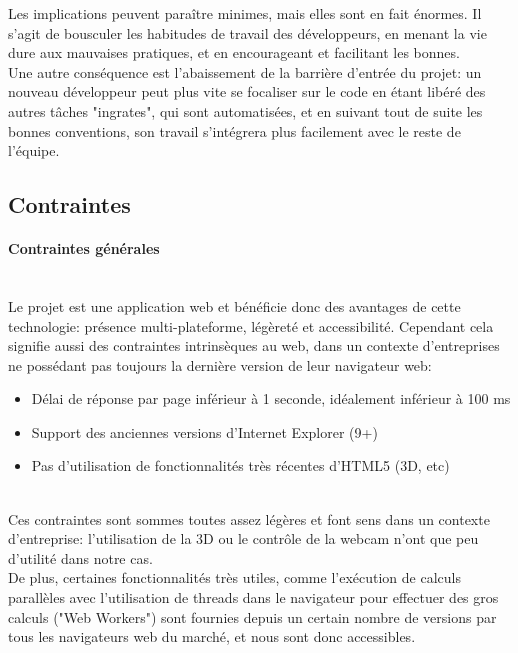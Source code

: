 \documentclass[a4paper,french,12pt]{article}
\begin{document}
	Les implications peuvent paraître minimes, mais elles sont en fait énormes. Il s'agit de bousculer les habitudes de travail des développeurs, en menant la vie dure aux mauvaises pratiques, et en encourageant et facilitant les bonnes.~\\	
	
	Une autre conséquence est l'abaissement de la barrière d'entrée du projet: un nouveau développeur peut plus vite se focaliser sur le code en étant libéré des autres tâches "ingrates", qui sont automatisées, et en suivant tout de suite les bonnes conventions, son travail s'intégrera plus facilement avec le reste de l'équipe.
				

	\subsection{Contraintes}
	
	\paragraph{Contraintes générales} ~\\
	Le projet est une application web et bénéficie donc des avantages de cette technologie: présence multi-plateforme, légèreté et accessibilité. Cependant cela signifie aussi des contraintes intrinsèques au web, dans un contexte d'entreprises ne possédant pas toujours la dernière version de leur navigateur web:~\\
	
	\begin{itemize}
		\item Délai de réponse par page inférieur à 1 seconde, idéalement inférieur à 100 ms
		\item Support des anciennes versions d'Internet Explorer (9+)
		\item Pas d'utilisation de fonctionnalités très récentes d'HTML5 (3D, etc)
	\end{itemize}~\\
	
 Ces contraintes sont sommes toutes assez légères et font sens dans un contexte d'entreprise: l'utilisation de la 3D ou le contrôle de la webcam n'ont que peu d'utilité dans notre cas.~\\	
 
 De plus, certaines fonctionnalités très utiles, comme l'exécution de calculs parallèles avec l'utilisation de threads dans le navigateur pour effectuer des gros calculs ("Web Workers") sont fournies depuis un certain nombre de versions par tous les navigateurs web du marché, et nous sont donc accessibles.~\\	
 
\end{document}
